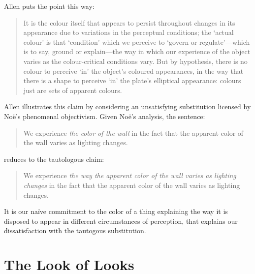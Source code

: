 \documentclass[12pt]{article}
\begin{document}
Allen puts the point this way:
	\begin{quote}
		It is the colour itself that appears to persist throughout changes in its appearance due to variations in the perceptual conditions; the `actual colour' is that `condition' which we perceive to `govern or regulate'---which is to say, ground or explain---the way in which our experience of the object varies as the colour-critical conditions vary. But by hypothesis, there is no colour to perceive `in' the object’s coloured appearances, in the way that there is a shape to perceive `in' the plate’s elliptical appearance: colours just are sets of apparent colours. \citep{Allen:2008kx}
	\end{quote}
Allen illustrates this claim by considering an unsatisfying substitution licensed by Noë's phenomenal objectivism. Given Noë's analysis, the sentence:
	\begin{quote}
		We experience \emph{the color of the wall} in the fact that the apparent color of the wall varies as lighting changes.
	\end{quote}
reduces to the tautologous claim:
	\begin{quote}
		We experience \emph{the way the apparent color of the wall varies as lighting changes} in the fact that the apparent color of the wall varies as lighting changes.
	\end{quote}
It is our naïve commitment to the color of a thing explaining the way it is disposed to appear in different circumstances of perception, that explains our dissatisfaction with the tautogous substitution.

\section{The Look of Looks} %
\label{sec:the_look_of_looks}
\end{document}
